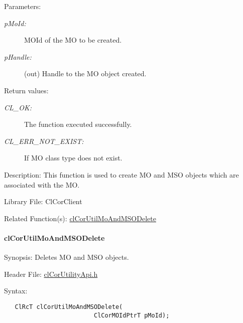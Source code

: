\begin{Desc}
\item[Parameters:]
\begin{description}
\item[{\em p\-Mo\-Id:}]MOId of the MO to be created. \item[{\em p\-Handle:}](out) Handle to the MO object created.\end{description}
\end{Desc}
\begin{Desc}
\item[Return values:]
\begin{description}
\item[{\em CL\_\-OK:}]The function executed successfully. \item[{\em CL\_\-ERR\_\-NOT\_\-EXIST:}]If MO class type does not exist.\end{description}
\end{Desc}
\begin{Desc}
\item[Description:]This function is used to create MO and MSO objects which are associated with the MO.\end{Desc}
\begin{Desc}
\item[Library File:]Cl\-Cor\-Client\end{Desc}
\begin{Desc}
\item[Related Function(s):]\hyperlink{group__group13}{cl\-Cor\-Util\-Mo\-And\-MSODelete} \end{Desc}
\hypertarget{pagecor271}{}\paragraph{cl\-Cor\-Util\-Mo\-And\-MSODelete}\label{pagecor271}
\begin{Desc}
\item[Synopsis:]Deletes MO and MSO objects.\end{Desc}
\begin{Desc}
\item[Header File:]\hyperlink{cl_cor_utility_api_8h}{cl\-Cor\-Utility\-Api.h}\end{Desc}
\begin{Desc}
\item[Syntax:]

\footnotesize\begin{verbatim}   ClRcT clCorUtilMoAndMSODelete(
                         ClCorMOIdPtrT pMoId);
\end{verbatim}
\normalsize
\end{Desc}
